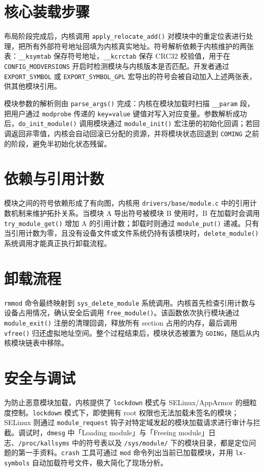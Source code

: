 \chapter{核心装载步骤}
布局阶段完成后，内核调用 \texttt{apply\_{}relocate\_{}add()} 对模块中的重定位表进行处理，把所有外部符号地址回填为内核真实地址。符号解析依赖于内核维护的两张表：\texttt{\_{}\_{}ksymtab} 保存符号地址，\texttt{\_{}\_{}kcrctab} 保存 CRC32 校验值，用于在 \texttt{CONFIG\_{}MODVERSIONS} 开启时检测模块与内核版本是否匹配。开发者通过 \texttt{EXPORT\_{}SYMBOL} 或 \texttt{EXPORT\_{}SYMBOL\_{}GPL} 宏导出的符号会被自动加入上述两张表，供其他模块引用。\par
模块参数的解析则由 \texttt{parse\_{}args()} 完成：内核在模块加载时扫描 \texttt{\_{}\_{}param} 段，把用户通过 \texttt{modprobe} 传递的 \texttt{key=value} 键值对写入对应变量。参数解析成功后，\texttt{do\_{}init\_{}module()} 调用模块通过 \texttt{module\_{}init()} 宏注册的初始化回调；若回调返回非零值，内核会自动回滚已分配的资源，并将模块状态回退到 \texttt{COMING} 之前的阶段，避免半初始化状态残留。\par
\chapter{依赖与引用计数}
模块之间的符号依赖形成了有向图，内核用 \texttt{drivers/base/module.c} 中的引用计数机制来维护拓扑关系。当模块 A 导出符号被模块 B 使用时，B 在加载时会调用 \texttt{try\_{}module\_{}get()} 增加 A 的引用计数；卸载时则通过 \texttt{module\_{}put()} 递减。只有当引用计数为零，且没有设备文件或文件系统仍持有该模块时，\texttt{delete\_{}module()} 系统调用才能真正执行卸载流程。\par
\chapter{卸载流程}
\texttt{rmmod} 命令最终映射到 \texttt{sys\_{}delete\_{}module} 系统调用。内核首先检查引用计数与设备占用情况，确认安全后调用 \texttt{free\_{}module()}。该函数依次执行模块通过 \texttt{module\_{}exit()} 注册的清理回调，释放所有 section 占用的内存，最后调用 \texttt{vfree()} 归还虚拟地址空间。整个过程结束后，模块状态被置为 \texttt{GOING}，随后从内核模块链表中移除。\par
\chapter{安全与调试}
为防止恶意模块加载，内核提供了 \texttt{lockdown} 模式与 SELinux/AppArmor 的细粒度控制。\texttt{lockdown} 模式下，即使拥有 root 权限也无法加载未签名的模块；SELinux 则通过 \texttt{module\_{}request} 钩子对特定域发起的模块加载请求进行审计与拦截。调试时，\texttt{dmesg} 中「Loading module」与「Freeing module」日志、\texttt{/proc/kallsyms} 中的符号表以及 \texttt{/sys/module/} 下的模块目录，都是定位问题的第一手资料。\texttt{crash} 工具可通过 \texttt{mod} 命令列出当前已加载模块，并用 \texttt{lx-symbols} 自动加载符号文件，极大简化了现场分析。\par
